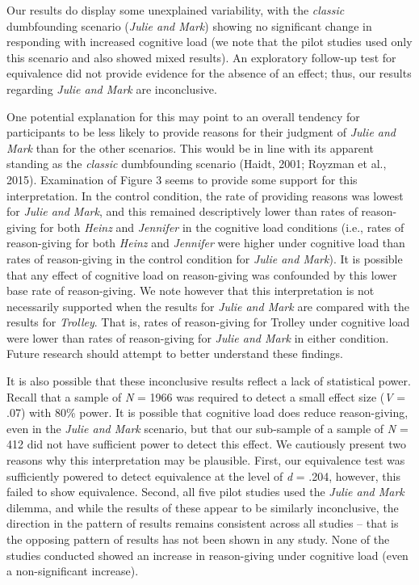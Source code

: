 \documentclass[
  man,floatsintext]{apa6}
\begin{document}
Our results do display some unexplained variability, with the \emph{classic} dumbfounding scenario (\emph{Julie and Mark}) showing no significant change in responding with increased cognitive load (we note that the pilot studies used only this scenario and also showed mixed results). An exploratory follow-up test for equivalence did not provide evidence for the absence of an effect; thus, our results regarding \emph{Julie and Mark} are inconclusive.

One potential explanation for this may point to an overall tendency for participants to be less likely to provide reasons for their judgment of \emph{Julie and Mark} than for the other scenarios. This would be in line with its apparent standing as the \emph{classic} dumbfounding scenario (Haidt, 2001; Royzman et al., 2015). Examination of Figure 3 seems to provide some support for this interpretation. In the control condition, the rate of providing reasons was lowest for \emph{Julie and Mark}, and this remained descriptively lower than rates of reason-giving for both \emph{Heinz} and \emph{Jennifer} in the cognitive load conditions (i.e., rates of reason-giving for both \emph{Heinz} and \emph{Jennifer} were higher under cognitive load than rates of reason-giving in the control condition for \emph{Julie and Mark}). It is possible that any effect of cognitive load on reason-giving was confounded by this lower base rate of reason-giving. We note however that this interpretation is not necessarily supported when the results for \emph{Julie and Mark} are compared with the results for \emph{Trolley}. That is, rates of reason-giving for Trolley under cognitive load were lower than rates of reason-giving for \emph{Julie and Mark} in either condition. Future research should attempt to better understand these findings.

It is also possible that these inconclusive results reflect a lack of statistical power. Recall that a sample of \emph{N} = 1966 was required to detect a small effect size (\emph{V} = .07) with 80\% power. It is possible that cognitive load does reduce reason-giving, even in the \emph{Julie and Mark} scenario, but that our sub-sample of a sample of \emph{N} = 412 did not have sufficient power to detect this effect. We cautiously present two reasons why this interpretation may be plausible. First, our equivalence test was sufficiently powered to detect equivalence at the level of \emph{d} = .204, however, this failed to show equivalence. Second, all five pilot studies used the \emph{Julie and Mark} dilemma, and while the results of these appear to be similarly inconclusive, the direction in the pattern of results remains consistent across all studies -- that is the opposing pattern of results has not been shown in any study. None of the studies conducted showed an increase in reason-giving under cognitive load (even a non-significant increase).
\end{document}
